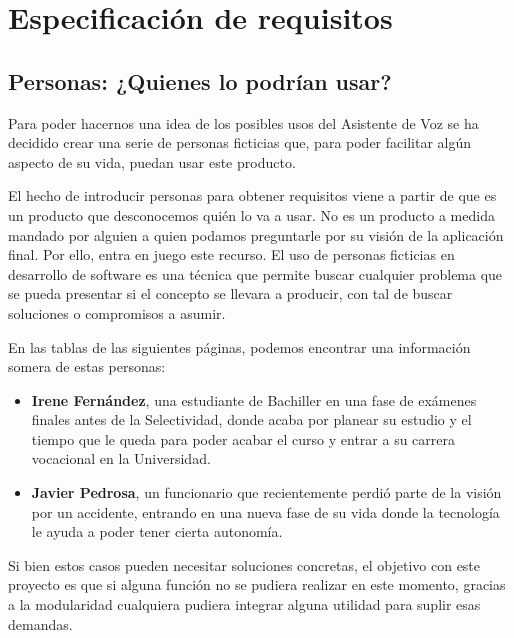 \chapter{Especificación de requisitos}

\noindent{}

\section{Personas: ¿Quienes lo podrían usar?}

Para poder hacernos una idea de los posibles usos del Asistente de Voz se ha decidido crear una serie de personas ficticias que, para poder facilitar algún aspecto de su vida, puedan usar este producto.

El hecho de introducir personas para obtener requisitos viene a partir de que es un producto que desconocemos quién lo va a usar. No es un producto a medida mandado por alguien a quien podamos preguntarle por su visión de la aplicación final. Por ello, entra en juego este recurso. El uso de personas ficticias en desarrollo de software es una técnica que permite buscar cualquier problema que se pueda presentar si el concepto se llevara a producir, con tal de buscar soluciones o compromisos a asumir.

En las tablas de las siguientes páginas, podemos encontrar una información somera de estas personas:

\begin{itemize}
	\item \textbf{Irene Fernández}, una estudiante de Bachiller en una fase de exámenes finales antes de la Selectividad, donde acaba por planear su estudio y el tiempo que le queda para poder acabar el curso y entrar a su carrera vocacional en la Universidad.
	
	\item \textbf{Javier Pedrosa}, un funcionario que recientemente perdió parte de la visión por un accidente, entrando en una nueva fase de su vida donde la tecnología le ayuda a poder tener cierta autonomía.
\end{itemize}

Si bien estos casos pueden necesitar soluciones concretas, el objetivo con este proyecto es que si alguna función no se pudiera realizar en este momento, gracias a la modularidad cualquiera pudiera integrar alguna utilidad para suplir esas demandas.

